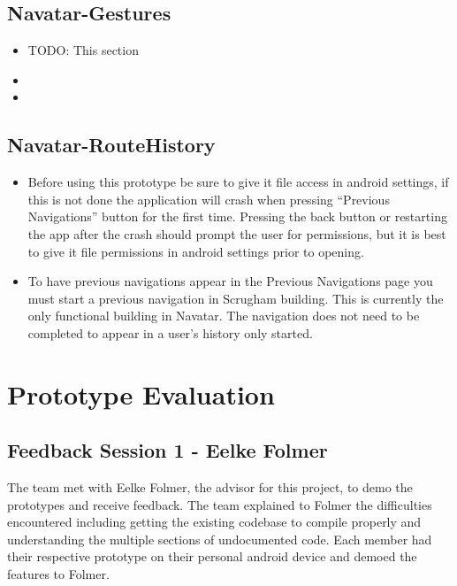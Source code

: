 \documentclass{scrreprt}
\begin{document}
\section{Navatar-Gestures}
	\begin{itemize}
		\item TODO: This section
		\item 
		\item
	\end{itemize}
	
\pagebreak

\section{Navatar-RouteHistory}
	\begin{itemize}
		\item Before using this prototype be sure to give it file access in android settings, if this is not done the application will crash when pressing “Previous Navigations” button for the first time. Pressing the back button or restarting the app after the crash should prompt the user for permissions, but it is best to give it file permissions in android settings prior to opening.

		\item To have previous navigations appear in the Previous Navigations page you must start a previous navigation in Scrugham building. This is currently the only functional building in Navatar. The navigation does not need to be completed to appear in a user's history only started.
		
	\end{itemize}

\chapter{Prototype Evaluation}

\section{Feedback Session 1 - Eelke Folmer}

The team met with Eelke Folmer, the advisor for this project, to demo the prototypes and receive feedback. The team explained to Folmer the difficulties encountered including getting the existing codebase to compile properly and understanding the multiple sections of undocumented code. Each member had their respective prototype on their personal android device and demoed the features to Folmer. 
\end{document}
